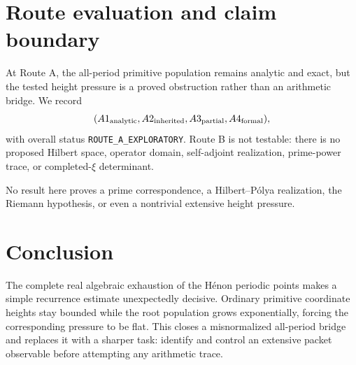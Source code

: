\documentclass[11pt]{article}
\theoremstyle{remark}
\begin{document}
\section{Route evaluation and claim boundary}
At Route A, the all-period primitive population remains analytic and exact,
but the tested height pressure is a proved obstruction rather than an
arithmetic bridge.  We record
\[
(A1_{\rm analytic},A2_{\rm inherited},A3_{\rm partial},A4_{\rm formal}),
\]
with overall status \texttt{ROUTE\_A\_EXPLORATORY}.  Route B is not testable:
there is no proposed Hilbert space, operator domain, self-adjoint realization,
prime-power trace, or completed-$\xi$ determinant.

No result here proves a prime correspondence, a Hilbert--P\'olya realization,
the Riemann hypothesis, or even a nontrivial extensive height pressure.

\section{Conclusion}
The complete real algebraic exhaustion of the H\'enon periodic points makes a
simple recurrence estimate unexpectedly decisive.  Ordinary primitive
coordinate heights stay bounded while the root population grows
exponentially, forcing the corresponding pressure to be flat.  This closes a
misnormalized all-period bridge and replaces it with a sharper task: identify
and control an extensive packet observable before attempting any arithmetic
trace.

\renewcommand{\bibfont}{\small}


\end{document}
